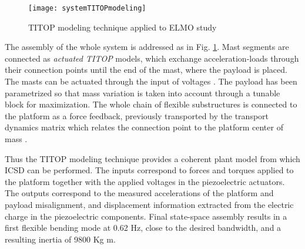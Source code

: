 \documentclass{ifacconf}
\begin{document}
\begin{figure} 
\centering
\texttt{[image: systemTITOPmodeling]}
\caption{TITOP modeling technique applied to ELMO study}
\label{fig:elmoTITOP}
\end{figure}

The assembly of the whole system is addressed as in Fig. \ref{fig:elmoTITOP}. Mast segments are connected as \textit{actuated TITOP} models, which exchange acceleration-loads through their connection points until the end of the mast, where the payload is placed. The masts can be actuated through the input of voltages . The payload has been parametrized so that mass variation is taken into account through a tunable block  for maximization. The whole chain of flexible substructures is connected to the platform as a force feedback, previously transported by the transport dynamics matrix  which relates the connection point  to the platform center of mass .

Thus the TITOP modeling technique provides a coherent plant model from which ICSD can be performed. The inputs correspond to forces and torques applied to the platform together with the applied voltages in the piezoelectric actuators. The outputs correspond to the measured accelerations of the platform and payload misalignment, and displacement information extracted from the electric charge in the piezoelectric components. Final state-space assembly results in a first flexible bending mode at 0.62 Hz, close to the desired bandwidth, and a resulting inertia of 9800 Kg m.
\end{document}
